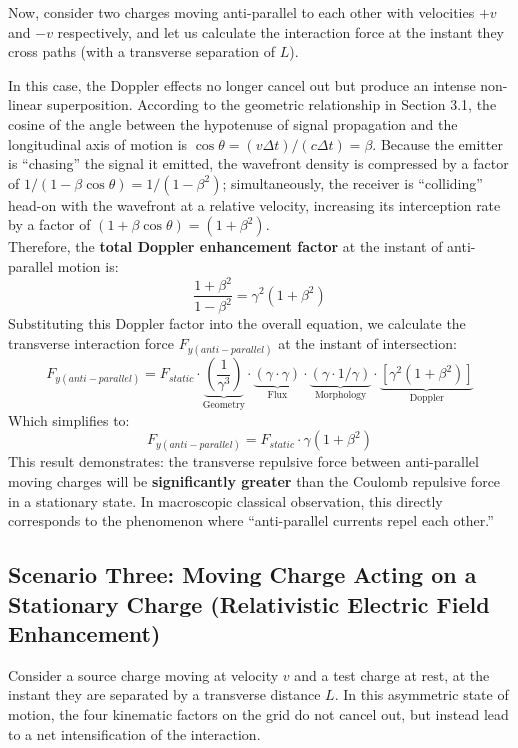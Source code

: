 \documentclass[12pt, a4paper]{article}
\begin{document}
Now, consider two charges moving anti-parallel to each other with velocities $+v$ and $-v$ respectively, and let us calculate the interaction force at the instant they cross paths (with a transverse separation of $L$).

In this case, the Doppler effects no longer cancel out but produce an intense non-linear superposition. According to the geometric relationship in Section 3.1, the cosine of the angle between the hypotenuse of signal propagation and the longitudinal axis of motion is $\cos\theta = (v\Delta t)/(c\Delta t) = \beta$. Because the emitter is ``chasing'' the signal it emitted, the wavefront density is compressed by a factor of $1/(1-\beta\cos\theta) = 1/(1-\beta^2)$; simultaneously, the receiver is ``colliding'' head-on with the wavefront at a relative velocity, increasing its interception rate by a factor of $(1+\beta\cos\theta) = (1+\beta^2)$. \\
Therefore, the \textbf{total Doppler enhancement factor} at the instant of anti-parallel motion is:
\[
\frac{1+\beta^2}{1-\beta^2} = \gamma^2(1+\beta^2)
\]
Substituting this Doppler factor into the overall equation, we calculate the transverse interaction force $F_{y(anti-parallel)}$ at the instant of intersection:
\[
F_{y(anti-parallel)} = F_{static} \cdot \underbrace{\left(\frac{1}{\gamma^3}\right)}_{\text{Geometry}} \cdot \underbrace{(\gamma \cdot \gamma)}_{\text{Flux}} \cdot \underbrace{(\gamma \cdot 1/\gamma)}_{\text{Morphology}} \cdot \underbrace{\left[ \gamma^2(1+\beta^2) \right]}_{\text{Doppler}}
\]
Which simplifies to:
\[
F_{y(anti-parallel)} = F_{static} \cdot \gamma(1+\beta^2)
\]
This result demonstrates: the transverse repulsive force between anti-parallel moving charges will be \textbf{significantly greater} than the Coulomb repulsive force in a stationary state. In macroscopic classical observation, this directly corresponds to the phenomenon where ``anti-parallel currents repel each other.''

\subsection{Scenario Three: Moving Charge Acting on a Stationary Charge (Relativistic Electric Field Enhancement)}

Consider a source charge moving at velocity $v$ and a test charge at rest, at the instant they are separated by a transverse distance $L$. In this asymmetric state of motion, the four kinematic factors on the grid do not cancel out, but instead lead to a net intensification of the interaction.
\end{document}
